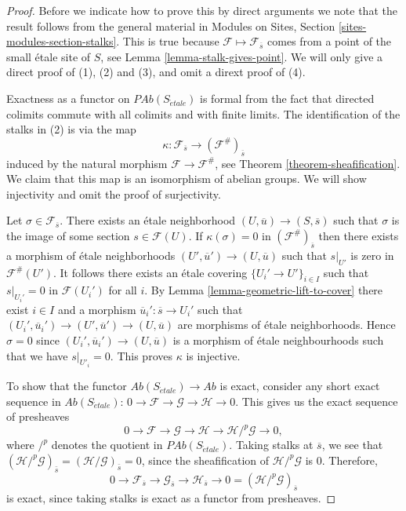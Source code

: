 \begin{proof}
Before we indicate how to prove this by direct arguments
we note that the result follows from the general material in
Modules on Sites, Section \ref{sites-modules-section-stalks}.
This is true because $\mathcal{F} \mapsto \mathcal{F}_{\overline{s}}$
comes from a point of the small \'etale site of $S$, see
Lemma \ref{lemma-stalk-gives-point}.
We will only give a direct proof of (1), (2) and (3), and omit
a dirext proof of (4).

\medskip\noindent
Exactness as a functor on $\textit{PAb}(S_{\acute{e}tale})$ is formal from the
fact that directed colimits commute with all colimits and with finite
limits. The identification of the stalks in (2) is via the map
$$
\kappa :
\mathcal{F}_{\overline{s}}
\longrightarrow
(\mathcal{F}^\#)_{\overline{s}}
$$
induced by the natural morphism $\mathcal{F}\to \mathcal{F}^\#$, see
Theorem \ref{theorem-sheafification}.
We claim that this map is an isomorphism of abelian groups. We will show
injectivity and omit the proof of surjectivity.

\medskip\noindent
Let $\sigma\in \mathcal{F}_{\overline{s}}$.
There exists an \'etale neighborhood
$(U, \overline{u})\to (S, \overline{s})$ such that $\sigma$ is the image of some
section $s \in \mathcal{F}(U)$. If $\kappa(\sigma) = 0$ in
$(\mathcal{F}^\#)_{\overline{s}}$ then there exists a morphism of \'etale
neighborhoods $(U', \overline{u}')\to (U, \overline{u})$ such that
$s|_{U'}$ is zero in $\mathcal{F}^\#(U')$. It follows there
exists an \'etale covering
$\{U_i'\to U'\}_{i\in I}$ such that $s|_{U_i'}=0$ in
$\mathcal{F}(U_i')$ for all $i$. By Lemma \ref{lemma-geometric-lift-to-cover}
there exist $i \in I$ and a morphism
$\overline{u}_i': \overline{s} \to U_i'$ such that
$(U_i', \overline{u}_i') \to (U', \overline{u}')\to (U, \overline{u})$
are morphisms of \'etale neighborhoods. Hence $\sigma = 0$
since $(U_i', \overline{u}_i') \to (U, \overline{u})$
is a morphism of \'etale neighbourhoods such that
we have $s|_{U'_i}=0$. This proves $\kappa$ is injective.

\medskip\noindent
To show that the functor $\textit{Ab}(S_{\acute{e}tale}) \to \textit{Ab}$ is
exact, consider any short exact sequence in $\textit{Ab}(S_{\acute{e}tale})$:
$
0\to \mathcal{F}\to \mathcal{G}\to \mathcal H \to 0.
$
This gives us the exact sequence of presheaves
$$
0 \to \mathcal{F} \to \mathcal{G} \to \mathcal H \to
\mathcal H/^p\mathcal{G} \to 0,
$$
where $/^p$ denotes the quotient in $\textit{PAb}(S_{\acute{e}tale})$.
Taking stalks at
$\overline{s}$, we see that $(\mathcal H /^p\mathcal{G})_{\bar{s}} =
(\mathcal H /\mathcal{G})_{\bar{s}} = 0$, since the sheafification of
$\mathcal H/^p\mathcal{G}$ is $0$.
Therefore,
$$
0\to \mathcal{F}_{\overline{s}	} \to \mathcal{G}_{\overline{s}} \to
\mathcal{H}_{\overline{s}} \to 0 = (\mathcal H/^p\mathcal{G})_{\overline{s}}
$$
is exact, since taking stalks is exact as a functor from presheaves.
\end{proof}

